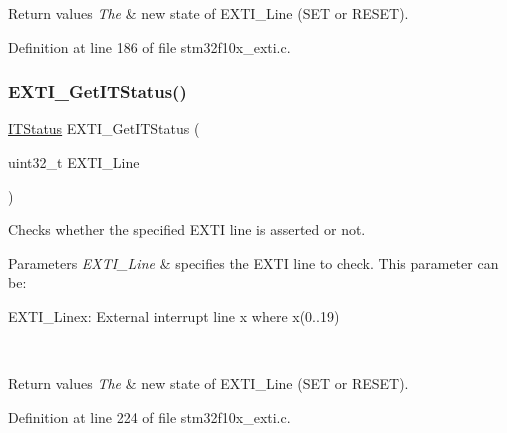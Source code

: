 \begin{DoxyRetVals}{Return values}
{\em The} & new state of E\+X\+T\+I\+\_\+\+Line (S\+ET or R\+E\+S\+ET). \\
\hline
\end{DoxyRetVals}


Definition at line 186 of file stm32f10x\+\_\+exti.\+c.

\mbox{\label{group___e_x_t_i___private___functions_gaf7b51519062ae42fd27ee689cab364aa}} 
\subsubsection{\texorpdfstring{E\+X\+T\+I\+\_\+\+Get\+I\+T\+Status()}{EXTI\_GetITStatus()}}
{\footnotesize\ttfamily \hyperlink{group___exported__types_gaacbd7ed539db0aacd973a0f6eca34074}{I\+T\+Status} E\+X\+T\+I\+\_\+\+Get\+I\+T\+Status (\begin{DoxyParamCaption}\item[{uint32\+\_\+t}]{E\+X\+T\+I\+\_\+\+Line }\end{DoxyParamCaption})}



Checks whether the specified E\+X\+TI line is asserted or not. 


\begin{DoxyParams}{Parameters}
{\em E\+X\+T\+I\+\_\+\+Line} & specifies the E\+X\+TI line to check. This parameter can be\+: \begin{DoxyItemize}
\item E\+X\+T\+I\+\_\+\+Linex\+: External interrupt line x where x(0..19) \end{DoxyItemize}
\\
\hline
\end{DoxyParams}

\begin{DoxyRetVals}{Return values}
{\em The} & new state of E\+X\+T\+I\+\_\+\+Line (S\+ET or R\+E\+S\+ET). \\
\hline
\end{DoxyRetVals}


Definition at line 224 of file stm32f10x\+\_\+exti.\+c.

